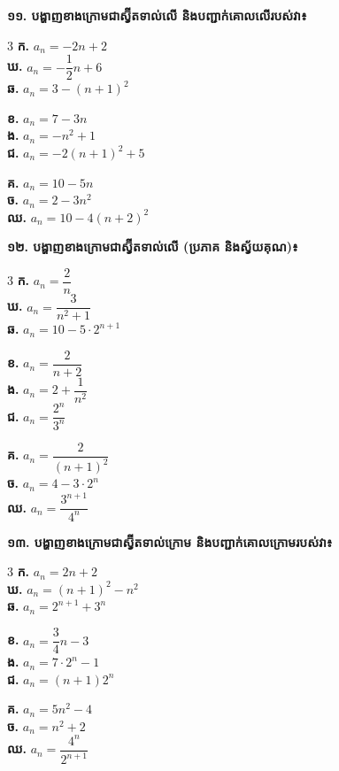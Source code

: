 \documentclass[11pt,a4paper]{article}
\begin{document}
\vspace{3pt}
\textbf{១១. បង្ហាញខាងក្រោមជាស្វ៊ីតទាល់លើ និងបញ្ជាក់គោលលើរបស់វា៖}
\begin{multicols}{3}
\textbf{ក.} $a_n = -2n + 2$\\[8pt]
\textbf{ឃ.} $a_n = -\dfrac{1}{2}n + 6$\\[8pt]
\textbf{ឆ.} $a_n = 3 - (n+1)^2$

\columnbreak
\textbf{ខ.} $a_n = 7 - 3n$\\[8pt]
\textbf{ង.} $a_n = -n^2 + 1$\\[8pt]
\textbf{ជ.} $a_n = -2(n+1)^2 + 5$

\columnbreak
\textbf{គ.} $a_n = 10 - 5n$\\[8pt]
\textbf{ច.} $a_n = 2 - 3n^2$\\[8pt]
\textbf{ឈ.} $a_n = 10 - 4(n+2)^2$
\end{multicols}

\newpage

\textbf{១២. បង្ហាញខាងក្រោមជាស្វ៊ីតទាល់លើ (ប្រភាគ និងស្វ័យគុណ)៖}
\begin{multicols}{3}
\textbf{ក.} $a_n = \dfrac{2}{n}$\\[8pt]
\textbf{ឃ.} $a_n = \dfrac{3}{n^2+1}$\\[8pt]
\textbf{ឆ.} $a_n = 10 - 5 \cdot 2^{n+1}$

\columnbreak
\textbf{ខ.} $a_n = \dfrac{2}{n+2}$\\[8pt]
\textbf{ង.} $a_n = 2 + \dfrac{1}{n^2}$\\[8pt]
\textbf{ជ.} $a_n = \dfrac{2^n}{3^n}$

\columnbreak
\textbf{គ.} $a_n = \dfrac{2}{(n+1)^2}$\\[8pt]
\textbf{ច.} $a_n = 4 - 3 \cdot 2^n$\\[8pt]
\textbf{ឈ.} $a_n = \dfrac{3^{n+1}}{4^n}$
\end{multicols}

\vspace{3pt}
\textbf{១៣. បង្ហាញខាងក្រោមជាស្វ៊ីតទាល់ក្រោម និងបញ្ជាក់គោលក្រោមរបស់វា៖}
\begin{multicols}{3}
\textbf{ក.} $a_n = 2n + 2$\\[8pt]
\textbf{ឃ.} $a_n = (n+1)^2 - n^2$\\[8pt]
\textbf{ឆ.} $a_n = 2^{n+1} + 3^n$

\columnbreak
\textbf{ខ.} $a_n = \dfrac{3}{4}n - 3$\\[8pt]
\textbf{ង.} $a_n = 7 \cdot 2^n - 1$\\[8pt]
\textbf{ជ.} $a_n = (n+1)2^n$

\columnbreak
\textbf{គ.} $a_n = 5n^2 - 4$\\[8pt]
\textbf{ច.} $a_n = n^2 + 2$\\[8pt]
\textbf{ឈ.} $a_n = \dfrac{4^n}{2^{n+1}}$
\end{multicols}
\end{document}
